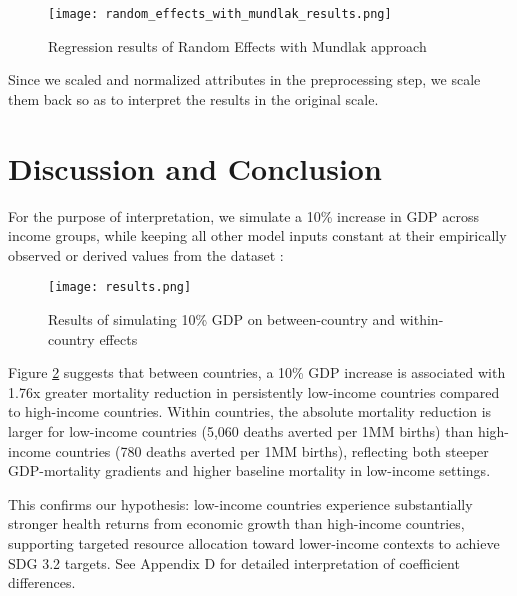 \documentclass[10pt,a4paper]{article}
\begin{document}
    \begin{figure}[H]
    \centering
    \begin{minipage}{0.7\textwidth}
        \centering
        \texttt{[image: random\_effects\_with\_mundlak\_results.png]}
    \end{minipage}
    \caption{Regression results of Random Effects with Mundlak approach}
    \label{fig:random_effects_with_mundlak}
    \end{figure}

    Since we scaled and normalized attributes in the preprocessing step, we scale them back so as to interpret the results in the original scale.

\section{Discussion and Conclusion}

For the purpose of interpretation, we simulate a 10\% increase in GDP across income groups, while keeping all other model inputs constant at their empirically observed or derived values from the dataset :

    \begin{figure}[H]
    \centering
    \begin{minipage}{0.7\textwidth}
        \centering
        \texttt{[image: results.png]}
    \end{minipage}
    \caption{Results of simulating 10\% GDP on between-country and within-country effects}
    \label{fig:simulation}
    \end{figure}

Figure \ref{fig:simulation} suggests that between countries, a 10\% GDP increase is associated with 1.76x greater mortality reduction in persistently low-income countries compared to high-income countries. Within countries, the absolute mortality reduction is larger for low-income countries (5,060 deaths averted per 1MM births) than high-income countries (780 deaths averted per 1MM births), reflecting both steeper GDP-mortality gradients and higher baseline mortality in low-income settings.

This confirms our hypothesis: low-income countries experience substantially stronger health returns from economic growth than high-income countries, supporting targeted resource allocation toward lower-income contexts to achieve SDG 3.2 targets. See Appendix D for detailed interpretation of coefficient differences.
\end{document}
